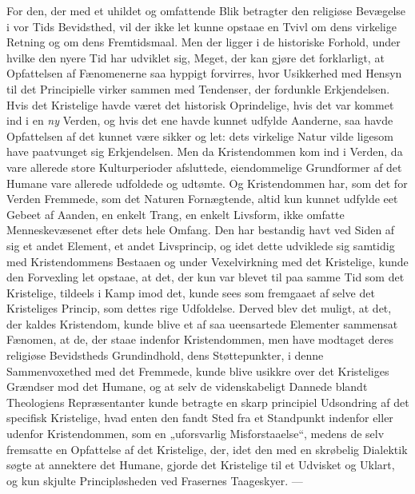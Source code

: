 \documentclass[12pt,a4paper,openany]{book}
\newcommand{\opage}[1]{\marginnote{\footnotesize\textit{[#1]}}}
\begin{document}
For den, der med et uhildet og omfattende Blik betragter
den religiøse Bevægelse i vor Tids Bevidsthed, vil
der ikke let kunne opstaae en Tvivl om dens virkelige Retning
og om dens Fremtidsmaal. Men der ligger i de
historiske Forhold, under hvilke den nyere Tid har udviklet
sig, Meget, der kan gjøre det forklarligt, at Opfattelsen af
Fænomenerne saa hyppigt forvirres, hvor Usikkerhed med
Hensyn til det Principielle virker sammen med Tendenser,
der fordunkle Erkjendelsen. Hvis det Kristelige havde været
det historisk Oprindelige, hvis det var kommet ind i en \emph{ny}
Verden, og hvis det ene havde kunnet udfylde Aanderne, saa
havde Opfattelsen af det kunnet være sikker og let: dets
virkelige Natur vilde ligesom have paatvunget sig Erkjendelsen.
Men da Kristendommen kom ind i Verden, da vare
allerede store Kulturperioder afsluttede, eiendommelige Grundformer
af det Humane vare allerede udfoldede og udtømte.
Og Kristendommen har, som det for Verden Fremmede, som det
Naturen Fornægtende, altid kun kunnet udfylde eet Gebeet
af Aanden, en enkelt Trang, en enkelt Livsform, ikke omfatte
Menneskevæsenet efter dets hele Omfang. Den har
bestandig havt ved Siden af sig et andet Element, et andet
Livsprincip, og idet dette udviklede sig samtidig med Kristendommens
Bestaaen og under Vexelvirkning med det
Kristelige, kunde den Forvexling let opstaae, at det, der kun
\opage{299}var blevet til paa samme Tid som det Kristelige, tildeels i
Kamp imod det, kunde sees som fremgaaet af selve det Kristeliges
Princip, som dettes rige Udfoldelse. Derved blev
det muligt, at det, der kaldes Kristendom, kunde blive et af
saa ueensartede Elementer sammensat Fænomen, at de, der
staae indenfor Kristendommen, men have modtaget deres
religiøse Bevidstheds Grundindhold, dens Støttepunkter, i
denne Sammenvoxethed med det Fremmede, kunde blive
usikkre over det Kristeliges Grændser mod det Humane, og
at selv de videnskabeligt Dannede blandt Theologiens Repræsentanter
kunde betragte en skarp principiel Udsondring af
det specifisk Kristelige, hvad enten den fandt Sted fra et
Standpunkt indenfor eller udenfor Kristendommen, som en
„uforsvarlig Misforstaaelse“, medens de selv fremsatte en
Opfattelse af det Kristelige, der, idet den med en skrøbelig
Dialektik søgte at annektere det Humane, gjorde det Kristelige
til et Udvisket og Uklart, og kun skjulte Principløsheden
ved Frasernes Taageskyer. ---
\end{document}
